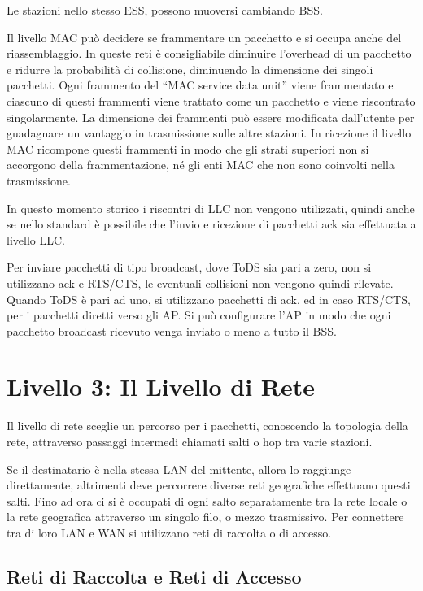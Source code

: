 \documentclass{article}
\numberwithin{equation}{subsection}
\begin{document}
Le stazioni nello stesso ESS, possono muoversi cambiando BSS. 


Il livello MAC può decidere se frammentare un pacchetto e si occupa anche del riassemblaggio. In queste reti è consigliabile diminuire l'overhead di un pacchetto e ridurre la 
probabilità di collisione, diminuendo la dimensione dei singoli pacchetti. 
Ogni frammento del ``MAC service data unit'' viene frammentato e ciascuno di questi frammenti viene trattato come un pacchetto e viene riscontrato singolarmente. La 
dimensione dei frammenti può essere modificata dall'utente per guadagnare un vantaggio in trasmissione sulle altre stazioni. 
In ricezione il livello MAC ricompone questi frammenti in modo che gli strati superiori non si accorgono della frammentazione, né gli enti MAC che non 
sono coinvolti nella trasmissione. 

In questo momento storico i riscontri di LLC non vengono utilizzati, quindi anche se nello standard è possibile che l'invio e ricezione di pacchetti ack sia effettuata a 
livello LLC. 

Per inviare pacchetti di tipo broadcast, dove ToDS sia pari a zero, non si utilizzano ack e RTS/CTS, le eventuali collisioni non vengono quindi rilevate. Quando 
ToDS è pari ad uno, si utilizzano pacchetti di ack, ed in caso RTS/CTS, per i pacchetti diretti verso gli AP. Si può configurare l'AP in modo che ogni pacchetto 
broadcast ricevuto venga inviato o meno a tutto il BSS. 


\clearpage

\section{Livello 3: Il Livello di Rete}

Il livello di rete sceglie un percorso per i pacchetti, conoscendo la topologia della rete, attraverso passaggi intermedi chiamati salti o hop tra varie stazioni. 

Se il destinatario è nella stessa LAN del mittente, allora lo raggiunge direttamente, altrimenti deve percorrere diverse reti geografiche effettuano questi salti. 
Fino ad ora ci si è occupati di ogni salto separatamente tra la rete locale o la rete geografica attraverso un singolo filo, o mezzo trasmissivo. 
Per connettere tra di loro LAN e WAN si utilizzano reti di raccolta o di accesso. 

\subsection{Reti di Raccolta e Reti di Accesso}
\end{document}
